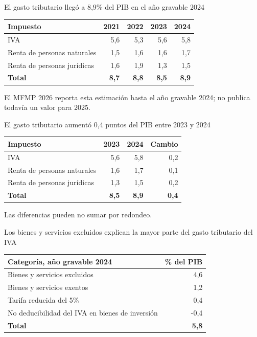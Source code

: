 \begin{frame}{El gasto tributario llegó a 8,9\% del PIB en el año gravable 2024}
\centering
\small
\begin{tabular}{lrrrr}
\toprule
\textbf{Impuesto} & \textbf{2021} & \textbf{2022} & \textbf{2023} & \textbf{2024} \\
\midrule
IVA                        & 5,6 & 5,3 & 5,6 & 5,8 \\
Renta de personas naturales & 1,5 & 1,6 & 1,6 & 1,7 \\
Renta de personas jurídicas & 1,6 & 1,9 & 1,3 & 1,5 \\
\midrule
\textbf{Total}             & \textbf{8,7} & \textbf{8,8} & \textbf{8,5} & \textbf{8,9} \\
\bottomrule
\end{tabular}
\vspace{0.25cm}
\scriptsize El MFMP 2026 reporta esta estimación hasta el año gravable 2024; no publica todavía un valor para 2025.
\end{frame}

\begin{frame}{El gasto tributario aumentó 0,4 puntos del PIB entre 2023 y 2024}
\centering
\small
\begin{tabular}{lrrr}
\toprule
\textbf{Impuesto} & \textbf{2023} & \textbf{2024} & \textbf{Cambio} \\
\midrule
IVA                        & 5,6 & 5,8 & 0,2 \\
Renta de personas naturales & 1,6 & 1,7 & 0,1 \\
Renta de personas jurídicas & 1,3 & 1,5 & 0,2 \\
\midrule
\textbf{Total}             & \textbf{8,5} & \textbf{8,9} & \textbf{0,4} \\
\bottomrule
\end{tabular}
\vspace{0.2cm}
\scriptsize Las diferencias pueden no sumar por redondeo.
\end{frame}

\begin{frame}{Los bienes y servicios excluidos explican la mayor parte del gasto tributario del IVA}
\centering
\small
\begin{tabular}{lr}
\toprule
\textbf{Categoría, año gravable 2024} & \textbf{\% del PIB} \\
\midrule
Bienes y servicios excluidos          &  4,6 \\
Bienes y servicios exentos            &  1,2 \\
Tarifa reducida del 5\%               &  0,4 \\
No deducibilidad del IVA en bienes de inversión & -0,4 \\
\midrule
\textbf{Total}                        & \textbf{5,8} \\
\bottomrule
\end{tabular}
\end{frame}
